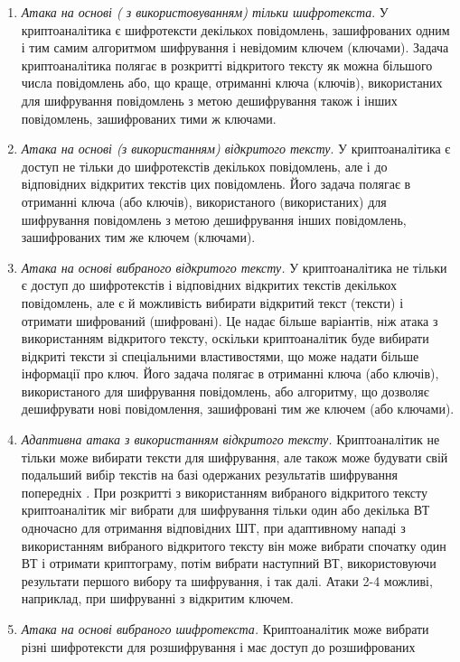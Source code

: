 \liststyleWWviiiNumii
\begin{enumerate}
\item \textit{Атака на основі ( з використовуванням) тільки шифротекста}. У
криптоаналітика є шифротексти декількох повідомлень, зашифрованих одним і тим
самим алгоритмом шифрування і невідомим ключем (ключами). Задача
криптоаналітика полягає в розкритті відкритого тексту як можна більшого числа
повідомлень або, що краще, отриманні ключа (ключів), використаних для
шифрування повідомлень з метою  дешифрування також і інших повідомлень,
зашифрованих тими ж ключами.
\item \textit{Атака на основі (з використанням) відкритого тексту}. У
криптоаналітика є доступ не тільки до шифротекстів декількох повідомлень, але і
до відповідних відкритих текстів цих повідомлень. Його задача полягає в
отриманні ключа (або ключів), використаного (використаних) для шифрування
повідомлень з метою дешифрування інших повідомлень, зашифрованих тим же ключем
(ключами).
\item \textit{Атака на основі вибраного відкритого тексту.} У криптоаналітика не
тільки є доступ до шифротекстів і відповідних відкритих текстів декількох
повідомлень, але є й можливість вибирати відкритий текст (тексти) і отримати
шифрований (шифровані). Це надає більше варіантів, ніж атака з використанням
відкритого тексту, оскільки криптоаналітик буде вибирати  відкриті тексти зі
спеціальними властивостями, що може надати більше інформації про ключ. Його
задача полягає в отриманні ключа (або ключів), використаного для шифрування
повідомлень, або алгоритму, що дозволяє дешифрувати нові повідомлення,
зашифровані тим  же ключем (або ключами). 
\item \textit{Адаптивна атака з використанням відкритого тексту.} Криптоаналітик
не тільки може вибирати тексти для шифрування, але також може будувати свій
подальший вибір текстів на базі одержаних результатів шифрування попередніх .
При розкритті з використанням вибраного відкритого тексту криптоаналітик міг
вибрати для шифрування тільки один або декілька ВТ одночасно для отримання
відповідних ШТ, при адаптивному нападі з використанням вибраного відкритого
тексту він може вибрати спочатку один ВТ і отримати криптограму, потім вибрати
наступний ВТ, використовуючи результати першого вибору та шифрування, і так
далі. Атаки 2-4 можливі, наприклад, при шифруванні з відкритим ключем.
\item \textit{Атака на основі вибраного шифротекста.} Криптоаналітик може
вибрати різні шифротексти для розшифрування і має доступ до розшифрованих

\end{enumerate}
